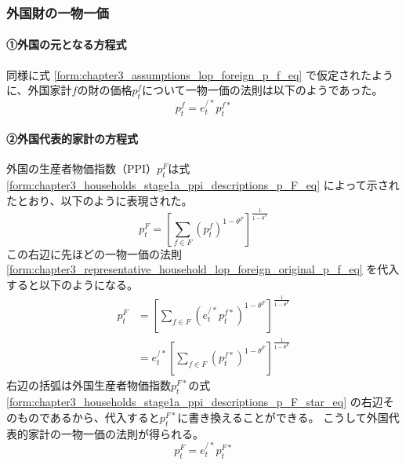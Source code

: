 \subsubsection{外国財の一物一価}
\label{sec:chapter3_representative_household_lop_foreign}

\paragraph{①外国の元となる方程式}
\label{sec:chapter3_representative_household_lop_foreign_original}
同様に式
\eqref{form:chapter3_assumptions_lop_foreign_p_f_eq}
で仮定されたように、外国家計\(f\)の財の価格\(p_t^f\)について一物一価の法則は以下のようであった。
\begin{equation}
\label{form:chapter3_representative_household_lop_foreign_original_p_f_eq}
    p_t^f=e_t^{/*}p_t^{f*}
\end{equation}

\paragraph{②外国代表的家計の方程式}
\label{sec:chapter3_representative_household_lop_foreign_representative}
外国の生産者物価指数（PPI）\(p_t^F\)は式
\eqref{form:chapter3_households_stage1a_ppi_descriptions_p_F_eq}
によって示されたとおり、以下のように表現された。
\begin{equation}
\label{form:chapter3_representative_household_lop_foreign_representative_p_F_def_eq}
    p_t^F=\left[\sum_{f\in F}(p_t^f)^{1-\theta^F}\right]^{\frac{1}{1-\theta^F}}
\end{equation}
この右辺に先ほどの一物一価の法則
\eqref{form:chapter3_representative_household_lop_foreign_original_p_f_eq}
を代入すると以下のようになる。
\begin{equation}
   \begin{aligned}
\label{form:chapter3_representative_household_lop_foreign_representative_p_f_modified_eq}
    p_t^F&=\left[\sum_{f\in F}(e_t^{/*}p_t^{f*})^{1-\theta^F}\right]^{\frac{1}{1-\theta^F}} \\
    &=e_t^{/*}\left[\sum_{f\in F}(p_t^{f*})^{1-\theta^F}\right]^{\frac{1}{1-\theta^F}}
   \end{aligned}
\end{equation}
右辺の括弧は外国生産者物価指数\(p_t^{F*}\)の式
\eqref{form:chapter3_households_stage1a_ppi_descriptions_p_F_star_eq}
の右辺そのものであるから、代入すると\(p_t^{F*}\)に書き換えることができる。
こうして外国代表的家計の一物一価の法則が得られる。
\begin{equation}
\label{form:chapter3_representative_household_lop_foreign_representative_p_F_lop_eq}
    p_t^F=e_t^{/*}p_t^{F*}
\end{equation}